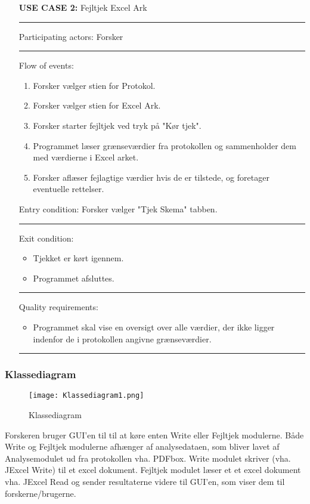 \documentclass[11pt]{article}
\begin{document}
\begin{itemize}
\item[\textbf{USE CASE 2:}] Fejltjek Excel Ark\\
\noindent\rule{14cm}{0.4pt}
\item [Participating actors:] Forsker\\
\noindent\rule{14cm}{0.4pt}

\item [Flow of events:]
\begin{enumerate}
\item Forsker vælger stien for Protokol.
\item Forsker vælger stien for Excel Ark.
\item Forsker starter fejltjek ved tryk på "Kør tjek".
\item Programmet læser grænseværdier fra protokollen og sammenholder dem med værdierne i Excel arket.
\item Forsker aflæser fejlagtige værdier hvis de er tilstede, og foretager eventuelle rettelser.
\end{enumerate}
\item [Entry condition:] Forsker vælger "Tjek Skema" tabben.\\
\noindent\rule{14cm}{0.4pt}

\item [Exit condition:]
\begin{itemize}
\item Tjekket er kørt igennem.
\item Programmet afsluttes.
\end{itemize}
\noindent\rule{14cm}{0.4pt}

\item [Quality requirements:]
\begin{itemize}
\item Programmet skal vise en oversigt over alle værdier, der ikke ligger indenfor de i protokollen
angivne grænseværdier. \\
\end{itemize}
\noindent\rule{14cm}{0.4pt}

\end{itemize}

\subsubsection{Klassediagram}
\begin{figure}[h!]
\texttt{[image: Klassediagram1.png]}
\caption{Klassediagram}
\end{figure}
Forskeren bruger GUI'en til til at køre enten Write eller Fejltjek modulerne. Både Write og Fejltjek modulerne afhænger af analysedataen, som bliver lavet af Analysemodulet ud fra protokollen vha. PDFbox. Write modulet skriver (vha. JExcel Write) til et excel dokument. Fejltjek modulet læser et et excel dokument vha. JExcel Read og sender resultaterne videre til GUI'en, som viser dem til forskerne/brugerne.
\end{document}
